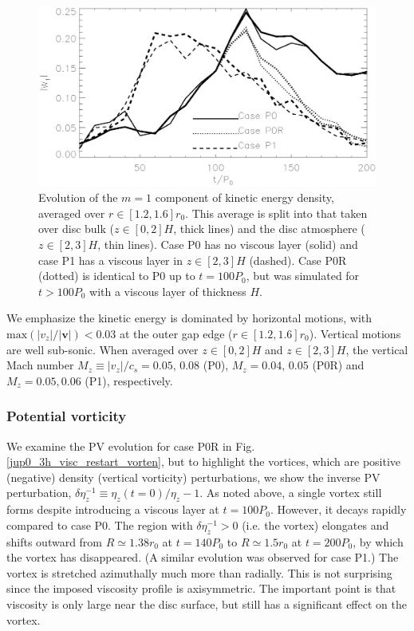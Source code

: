 \begin{figure}
  \centering
  \includegraphics[width=\linewidth]{figures/pdisk_kerz_cases_planet_m1}
  \caption{Evolution of the $m=1$ component of kinetic energy density,
    averaged over $r\in[1.2,1.6]r_0$. This average
    is split into that taken over disc bulk ($z\in[0,2]H$, thick
    lines) and the disc atmosphere ($z\in[2,3]H$, thin lines). Case P0
    has no viscous layer (solid) and case P1 has a viscous layer in
    $z\in[2,3]H$ (dashed). Case P0R (dotted) is identical to P0 up to $t=100P_0$,
    but was simulated for $t>100P_0$ with a viscous layer of thickness
    $H$.  
\label{pdisk_kerz_cases_planet}}
\end{figure}

We emphasize the kinetic energy is dominated by horizontal
motions, with $\mathrm{max}(|v_z|/|\bm{v}|) < 0.03$ at the outer
gap edge ($r\in[1.2,1.6]r_0$). Vertical motions are well sub-sonic. When averaged
over $z\in[0,2]H$ and $z\in[2,3]H$, the vertical Mach number
$M_z\equiv|v_z|/c_s=0.05,\,0.08$ (P0), $M_z=0.04,\,0.05$ (P0R) and
$M_z=0.05,0.06$ (P1), respectively. %

\subsubsection{Potential vorticity}
We examine the PV evolution for case P0R in
Fig. \ref{jup0_3h_visc_restart_vorten}, but  
to highlight the vortices, which are positive (negative)
density (vertical vorticity) perturbations, we show the inverse PV
perturbation, $\delta\eta_z^{-1}\equiv\eta_z(t=0)/\eta_z - 1$. As
noted above, a single vortex still forms  
despite introducing a viscous layer at $t=100P_0$. However, it
decays rapidly compared to case P0. %
The region with $\delta\eta_z^{-1}>0$ (i.e. the vortex) elongates and 
shifts outward from $R\simeq 1.38r_0$ at $t=140P_0$ to $R\simeq1.5r_0$
at $t=200P_0$, by which the vortex has disappeared. (A similar
evolution was observed for case P1.) The vortex is stretched
azimuthally much more than radially. This is not surprising since the
imposed viscosity profile is axisymmetric. The important point is
that viscosity is only large near the disc surface, but still has a
significant effect on the vortex. 

